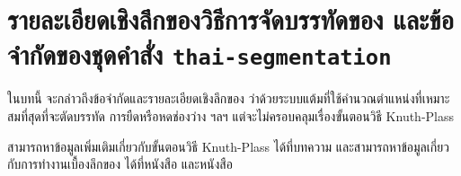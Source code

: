 \section{
  รายละเอียดเชิงลึกของวิธีการจัดบรรทัดของ \texlogo และข้อจำกัดของชุดคำสั่ง
  \texttt{thai-segmentation}
}

ในบทนี้ จะกล่าวถึงข้อจำกัดและรายละเอียดเชิงลึกของ \texlogo
ว่าด้วยระบบแต้มที่ใช้คำนวณตำแหน่งที่เหมาะสมที่สุดที่จะตัดบรรทัด
การยืดหรือหดช่องว่าง ฯลฯ แต่จะไม่ครอบคลุมเรื่องขั้นตอนวิธี Knuth-Plass

สามารถหาข้อมูลเพิ่มเติมเกี่ยวกับขั้นตอนวิธี Knuth-Plass ได้ที่บทความ
 \parencite{knuth-plass}
และสามารถหาข้อมูลเกี่ยวกับการทำงานเบื้องลึกของ \texlogo ได้ที่หนังสือ
 \parencite{texbook} และหนังสือ 
\parencite{texbytopic}

